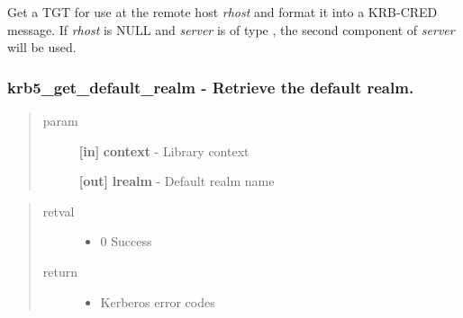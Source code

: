 \documentclass[letterpaper,10pt,english]{sphinxmanual}
\begin{document}
Get a TGT for use at the remote host \emph{rhost} and format it into a KRB-CRED message. If \emph{rhost} is NULL and \emph{server} is of type {\hyperref[appdev/refs/macros/KRB5_NT_SRV_HST:KRB5_NT_SRV_HST]{}} , the second component of \emph{server} will be used.


\subsubsection{krb5\_get\_default\_realm -  Retrieve the default realm.}
\label{appdev/refs/api/krb5_get_default_realm:krb5-get-default-realm-retrieve-the-default-realm}\label{appdev/refs/api/krb5_get_default_realm::doc}

\begin{fulllineitems}
\label{appdev/refs/api/krb5_get_default_realm:krb5_get_default_realm}
\end{fulllineitems}

\begin{quote}\begin{description}
\item[{param}] \leavevmode
\textbf{{[}in{]}} \textbf{context} - Library context

\textbf{{[}out{]}} \textbf{lrealm} - Default realm name

\end{description}\end{quote}
\begin{quote}\begin{description}
\item[{retval}] \leavevmode\begin{itemize}
\item {} 
0   Success

\end{itemize}

\item[{return}] \leavevmode\begin{itemize}
\item {} 
Kerberos error codes

\end{itemize}

\end{description}\end{quote}
\end{document}
